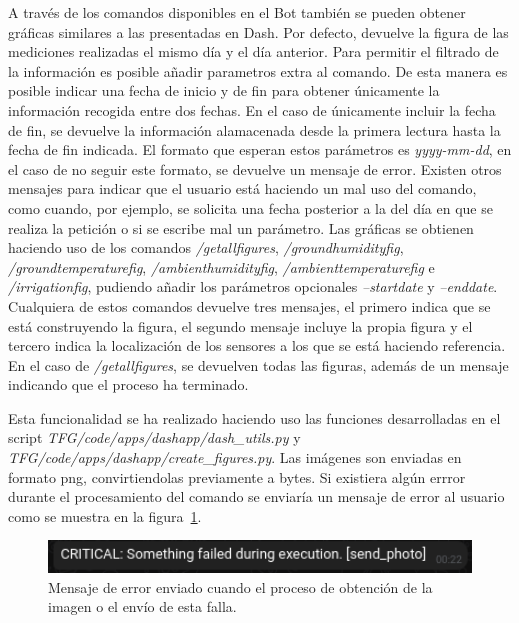 \documentclass[a4paper, 12pt, oneside]{book}
\begin{document}
A través de los comandos disponibles en el Bot también se pueden obtener gráficas similares a las presentadas en Dash. Por defecto, devuelve la figura de las mediciones realizadas el mismo día y el día anterior. Para permitir el filtrado de la información es posible añadir parametros extra al comando. De esta manera es posible indicar una fecha de inicio y de fin para obtener únicamente la información recogida entre dos fechas. En el caso de únicamente incluir la fecha de fin, se devuelve la información alamacenada desde la primera lectura hasta la fecha de fin indicada. El formato que esperan estos parámetros es \textit{yyyy-mm-dd}, en el caso de no seguir este formato, se devuelve un mensaje de error.
Existen otros mensajes para indicar que el usuario está haciendo un mal uso del comando, como cuando, por ejemplo, se solicita una fecha posterior a la del día en que se realiza la petición o si se escribe mal un parámetro.
Las gráficas se obtienen haciendo uso de los comandos \textit{/getallfigures}, \textit{/groundhumidityfig}, \textit{/groundtemperaturefig}, \textit{/ambienthumidityfig}, \textit{/ambienttemperaturefig} e \textit{/irrigationfig}, pudiendo añadir los parámetros opcionales \textit{--startdate} y \textit{--enddate}. Cualquiera de estos comandos devuelve tres mensajes, el primero indica que se está construyendo la figura, el segundo mensaje incluye la propia figura y el tercero indica la localización de los sensores a los que se está haciendo referencia. En el caso de \textit{/getallfigures}, se devuelven todas las figuras, además de un mensaje indicando que el proceso ha terminado.

Esta funcionalidad se ha realizado haciendo uso las funciones desarrolladas en el script \textit{TFG/code/apps/dashapp/dash\_utils.py} y \textit{TFG/code/apps/dashapp/create\_figures.py}. Las imágenes son enviadas en formato png, convirtiendolas previamente a bytes. Si existiera algún errror durante el procesamiento del comando se enviaría un mensaje de error al usuario como se muestra en la figura~\ref{figura:error send photo}.
\begin{figure}[H]
	\centering
    \includegraphics[width=12cm, keepaspectratio]{img/error_send_photo}
    \caption{Mensaje de error enviado cuando el proceso de obtención de la imagen o el envío de esta falla.}
    \label{figura:error send photo}
\end{figure}
\end{document}
